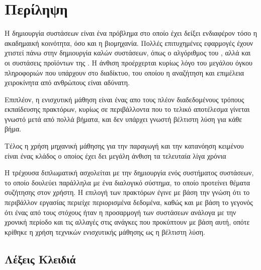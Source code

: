 \maketitle

\blankpagecount

\examinationpage

\copyrightspage

\justifying


\chapter*{Περίληψη}
Η δημιουργία συστάσεων είναι ένα πρόβλημα στο οποίο έχει δείξει
ενδιαφέρον τόσο η ακαδημαική κοινότητα, όσο και η βιομηχανία. Πολλές επιτυχημένες εφαρμογές έχουν χτιστεί πάνω στην δημιουργία καλών
συστάσεων, όπως ο αλγόριθμος του , αλλά και οι συστάσεις προϊόντων της .
Η άνθιση προέρχερται κυρίως λόγο του μεγάλου όγκου πληροφοριών που υπάρχουν στο
διαδίκτυο, του οποίου η αναζήτηση και επιμέλεια χειροκίνητα από ανθρώπους είναι αδύνατη.

\noindent
Επιπλέον, η ενισχυτική
μάθηση είναι ένας απο τους πλέον διαδεδομένους τρόπους εκπαίδευσης
πρακτόρων, κυρίως σε περιβάλλοντα που το τελικό αποτέλεσμα γίνεται
γνωστό μετά από πολλά βήματα, και δεν υπάρχει γνωστή βέλτιστη λύση για κάθε βήμα.

\noindent
Τέλος η χρήση μηχανική μάθησης για την παραγωγή και την κατανόηση
κειμένου είναι ένας κλάδος ο οποίος έχει δει μεγάλη άνθιση τα
τελευταία λίγα χρόνια

\noindent
Η τρέχουσα διπλωματική ασχολείται με την δημιουργία ενός συστήματος συστάσεων, το οποίο δουλεύει παράλληλα με ένα διαλογικό σύστημα, το
οποίο προτείνει θέματα συζήτησης στον χρήστη. Η επιλογή των πρακτόρων
έγινε με βάση την γνώση ότι το περιβάλλον εργασίας περιείχε περιορισμένα δεδομένα, καθώς και με βάση το γεγονός ότι
ένας από τους στόχους ήταν η προσαρμογή των συστάσεων ανάλογα με την χρονική περίοδο και τις αλλαγές στις ανάγκες που προκύπτουν με βάση αυτή,
οπότε κρίθηκε η χρήση τεχνικών ενισχυτικής μάθησης ως η βέλτιστη λύση.
\vspace{20ex}
\section*{Λέξεις Κλειδιά}


